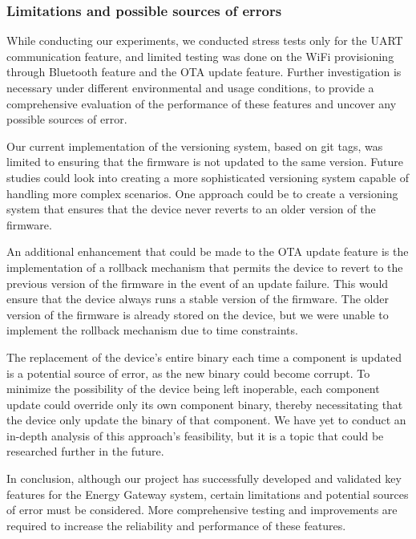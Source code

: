 \subsubsection{Limitations and possible sources of errors}
\label{sec:limitations}

While conducting our experiments, we conducted stress tests only for the UART communication feature, and limited testing was done on the WiFi provisioning through Bluetooth feature and the OTA update feature. Further investigation is necessary under different environmental and usage conditions, to provide a comprehensive evaluation of the performance of these features and uncover any possible sources of error.

Our current implementation of the versioning system, based on git tags, was limited to ensuring that the firmware is not updated to the same version. Future studies could look into creating a more sophisticated versioning system capable of handling more complex scenarios. One approach could be to create a versioning system that ensures that the device never reverts to an older version of the firmware.

An additional enhancement that could be made to the OTA update feature is the implementation of a rollback mechanism that permits the device to revert to the previous version of the firmware in the event of an update failure. This would ensure that the device always runs a stable version of the firmware. The older version of the firmware is already stored on the device, but we were unable to implement the rollback mechanism due to time constraints.

The replacement of the device's entire binary each time a component is updated is a potential source of error, as the new binary could become corrupt. To minimize the possibility of the device being left inoperable, each component update could override only its own component binary, thereby necessitating that the device only update the binary of that component. We have yet to conduct an in-depth analysis of this approach's feasibility, but it is a topic that could be researched further in the future.

In conclusion, although our project has successfully developed and validated key features for the Energy Gateway system, certain limitations and potential sources of error must be considered. More comprehensive testing and improvements are required to increase the reliability and performance of these features.